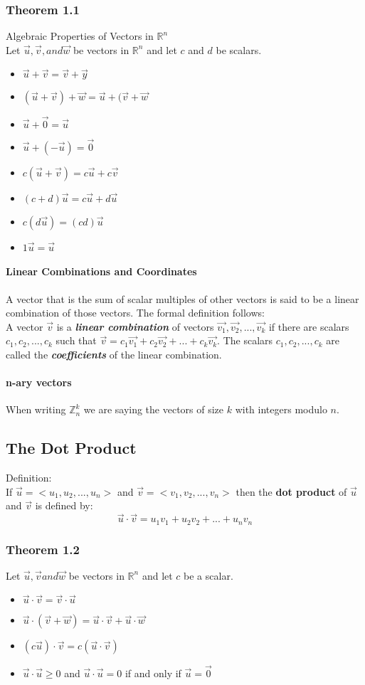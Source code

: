 \documentclass{article}
\newcommand{\p}[1]{\paragraph{#1}} %
\begin{document}
		\subsubsection{Theorem 1.1}
		Algebraic Properties of Vectors in $\mathbb{R}^n$ \\
		Let $\vec{u}, \vec{v}, and \vec{w}$ be vectors in $\mathbb{R}^n$ and let $c$ and $d$ be 
		scalars.
		\begin{itemize}
			\item{$\vec{u}+\vec{v} = \vec{v}+\vec{y}$}
			\item{$(\vec{u}+\vec{v}) + \vec{w} = \vec{u}+(\vec{v}+\vec{w}$}
			\item{$\vec{u}+\vec{0} = \vec{u}$}
			\item{$\vec{u}+(-\vec{u})=\vec{0}$}
			\item{$c(\vec{u}+\vec{v})=c\vec{u}+c\vec{v}$}
			\item{$(c+d)\vec{u}=c\vec{u}+d\vec{u}$}
			\item{$c(d\vec{u})=(cd)\vec{u}$}
			\item{$1\vec{u} = \vec{u}$}
		\end{itemize}
	
	\p{Linear Combinations and Coordinates}
	A vector that is the sum of scalar multiples of other vectors is said to be a linear combination of 
	those vectors. The formal definition follows:\\
	A vector $\vec{v}$ is a \textit{\textbf{linear combination}} of vectors $\vec{v_1},\vec{v_2},...,
	\vec{v_k}$ if there are scalars $c_1,c_2,...,c_k$ such that $\vec{v}
	=c_1\vec{v_1}+c_2\vec{v_2}+...+c_k\vec{v_k}$. The scalars $c_1,c_2,...,c_k$ are called the 
	\textit{\textbf{coefficients}} of the linear combination.
	
	\p{n-ary vectors}
	When writing $\mathbb{Z}_n^k$ we are saying the vectors of size $k$ with integers modulo $n
	$.
	
	\subsection{The Dot Product}
	Definition: \\
	If $\vec{u} = <u_1,u_2,...,u_n>$ and $ \vec{v} = <v_1,v_2,...,v_n>$ then the \textbf{dot product} 
	of $\vec{u}$ and $\vec{v}$ is defined by:
	\[ \vec{u} \cdot \vec{v} = u_1v_1 + u_2v_2 +...+ u_nv_n \]
	
		\subsubsection{Theorem 1.2}
		Let $\vec{u},\vec{v} and \vec{w}$ be vectors in $\mathbb{R}^n$ and let $c$ be a scalar.
		\begin{itemize}
			\item{$\vec{u}\cdot\vec{v}=\vec{v}\cdot\vec{u}$}
			\item{$\vec{u}\cdot(\vec{v}+\vec{w})=\vec{u}\cdot\vec{v}+\vec{u}\cdot\vec{w}$}
			\item{$(c\vec{u})\cdot\vec{v}=c(\vec{u}\cdot\vec{v})$}
			\item{$\vec{u}\cdot\vec{u}\ge0$ and $\vec{u}\cdot\vec{u}=0$ if and only if $\vec{u} 
			= \vec{0}$}
		\end{itemize}
		
\end{document}
